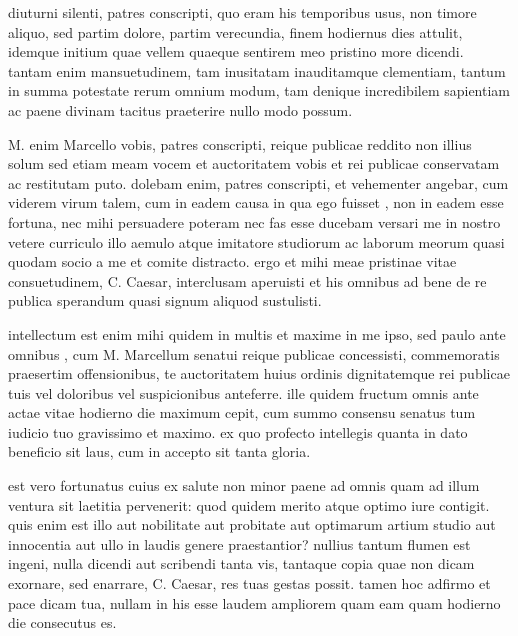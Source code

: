 
 diuturni silenti, patres conscripti, quo eram his temporibus usus, non timore aliquo, sed partim dolore, partim verecundia, finem hodiernus dies attulit, idemque initium quae vellem quaeque sentirem meo pristino more dicendi. tantam enim mansuetudinem, tam inusitatam inauditamque clementiam, tantum in summa potestate rerum omnium modum, tam denique incredibilem sapientiam ac paene divinam tacitus praeterire nullo modo possum.

 M. enim Marcello vobis, patres conscripti, reique publicae reddito non illius solum sed etiam meam vocem et auctoritatem vobis et rei publicae conservatam ac restitutam puto. dolebam enim, patres conscripti, et vehementer angebar, cum viderem virum talem, cum in eadem causa in qua ego fuisset , non in eadem esse fortuna, nec mihi persuadere poteram nec fas esse ducebam versari me in nostro vetere curriculo illo aemulo atque imitatore studiorum ac laborum meorum quasi quodam socio a me et comite distracto. ergo et mihi meae pristinae vitae consuetudinem, C. Caesar, interclusam aperuisti et his omnibus ad bene de re publica sperandum quasi signum aliquod sustulisti.

 intellectum est enim mihi quidem in multis et maxime in me ipso, sed paulo ante omnibus , cum M. Marcellum senatui reique publicae concessisti, commemoratis praesertim offensionibus, te auctoritatem huius ordinis dignitatemque rei publicae tuis vel doloribus vel suspicionibus anteferre. ille quidem fructum omnis ante actae vitae hodierno die maximum cepit, cum summo consensu senatus tum iudicio tuo gravissimo et maximo. ex quo profecto intellegis quanta in dato beneficio sit laus, cum in accepto sit tanta gloria.

 est vero fortunatus cuius ex salute non minor paene ad omnis quam ad illum ventura sit laetitia pervenerit: quod quidem merito atque optimo iure contigit. quis enim est illo aut nobilitate aut probitate aut optimarum artium studio aut innocentia aut ullo in laudis genere praestantior? nullius tantum flumen est ingeni, nulla dicendi aut scribendi tanta vis, tantaque copia quae non dicam exornare, sed enarrare, C. Caesar, res tuas gestas possit. tamen hoc adfirmo et pace dicam tua, nullam in his esse laudem ampliorem quam eam quam hodierno die consecutus es.

